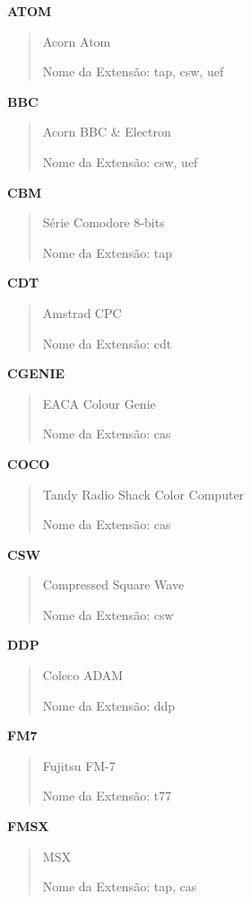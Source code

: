 \documentclass[letterpaper,10pt,brazil]{sphinxmanual}
\begin{document}
\textbf{ATOM}
\begin{quote}

Acorn Atom

Nome da Extensão: tap, csw, uef
\end{quote}

\textbf{BBC}
\begin{quote}

Acorn BBC \& Electron

Nome da Extensão: csw, uef
\end{quote}

\textbf{CBM}
\begin{quote}

Série Comodore 8-bits

Nome da Extensão: tap
\end{quote}

\textbf{CDT}
\begin{quote}

Amstrad CPC

Nome da Extensão: cdt
\end{quote}

\textbf{CGENIE}
\begin{quote}

EACA Colour Genie

Nome da Extensão: cas
\end{quote}

\textbf{COCO}
\begin{quote}

Tandy Radio Shack Color Computer

Nome da Extensão: cas
\end{quote}

\textbf{CSW}
\begin{quote}

Compressed Square Wave

Nome da Extensão: csw
\end{quote}

\textbf{DDP}
\begin{quote}

Coleco ADAM

Nome da Extensão: ddp
\end{quote}

\textbf{FM7}
\begin{quote}

Fujitsu FM-7

Nome da Extensão: t77
\end{quote}

\textbf{FMSX}
\begin{quote}

MSX

Nome da Extensão: tap, cas
\end{quote}
\end{document}
